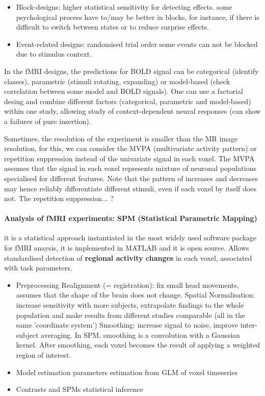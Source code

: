 \documentclass[12pt,article,oneside,a4paper]{memoir}
\begin{document}
\begin{itemize}
\item Block-designs:
\subitem higher statistical sensitivity for detecting effects.
\subitem some psychological process have to/may be better in blocks, for instance, if there is difficult to switch between states or to reduce surprise effects.
\item Event-related designs:
\subitem randomised trial order
\subitem some events can not be blocked due to stimulus context.
\end{itemize}

In the fMRI designs, the predictions for BOLD signal can be categorical (identify classes), parametric (stimuli rotating, expanding) or model-based (check correlation between some model and BOLD signals). One can use a factorial desing and combine different factors (categorical, parametric and model-based) within one study, allowing study of context-dependent neural responses (can show a failures of pure insertion).

Sometimes, the resolution of the experiment is smaller than the MR image resolution, for this, we can consider the MVPA (multivariate activity pattern) or repetition suppression instead of the univariate signal in each voxel. The MVPA assumes that the signal in each voxel represents mixture of neuronal populations specialised for different features. Note that the pattern of increases and decreases may hence reliably differentiate different stimuli, even if each voxel by itself does not. The repetition suppression... ?

\paragraph{ Analysis of fMRI experiments: SPM (Statistical Parametric Mapping) } it is a statistical approach instantiated in the most widely used software package for fMRI anaysis, it is implemented in MATLAB and it is open source. Allows standardised detection of \textbf{regional activity changes} in each voxel, associated with task parameters.

\begin{itemize}
\item Preprocessing
\subitem Realignment (= registration): fix small head movements, assumes that the shape of the brain does not change.
\subitem Spatial Normalisation: increase sensitivity with more subjects, extrapolate findings to the whole population and make results from different studies comparable (all in the same 'coordinate system')
\subitem Smoothing: increase signal to noise, improve inter-subject averaging. In SPM, smoothing is a convolution with a Gaussian kernel. After smoothing, each voxel becomes the result of applying a weighted region of interest.
\item Model estimation
\subitem parameters estimation from GLM of voxel timeseries
\item Contrasts and SPMs
\subitem statistical inference
\end{itemize}
\end{document}

